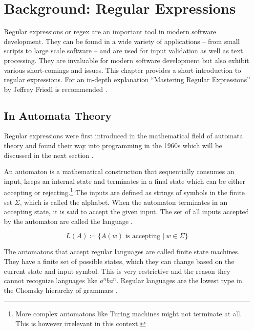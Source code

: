 
\chapter{Background: Regular Expressions} \label{chapter:intro}

Regular expressions or regex are an important tool in modern software development. They can be found in a wide variety of applications -- from small scripts to large scale software -- and are used for input validation as well as text processing. They are invaluable for modern software development but also exhibit various short-comings and issues. This chapter provides a short introduction to regular expressions. For an in-depth explanation \enquote{Mastering Regular Expressions} by Jeffrey Friedl is recommended \cite{MasteringRegex}.

\section{In Automata Theory} \label{sec:regexInAutomata}

Regular expressions were first introduced in the mathematical field of automata theory and found their way into programming in the 1960s which will be discussed in the next section \cite{RegularExpressionSearchAlgorithm}. 

An automaton is a mathematical construction that sequentially consumes an input, keeps an internal state and terminates in a final state which can be either accepting or rejecting.\footnote{More complex automatons like Turing machines might not terminate at all. This is however irrelevant in this context.} The inputs are defined as strings of symbols in the finite set $\Sigma$, which is called the alphabet. When the automaton terminates in an accepting state, it is said to accept the given input. The set of all inputs accepted by the automaton are called the language \cite[13]{TheoryOfComputation}.

\begin{equation*}
L(A) \coloneqq \{ A(w)\text{ is accepting} \mid w \in \Sigma \}
\end{equation*}

The automatons that accept regular languages are called finite state machines. They have a finite set of possible states, which they can change based on the current state and input symbol. This is very restrictive and the reason they cannot recognize languages like $a^nba^n$. Regular languages are the lowest type in the Chomsky hierarchy of grammars \cite{ChomskyCertainFormalPropertiesGrammars}. 

